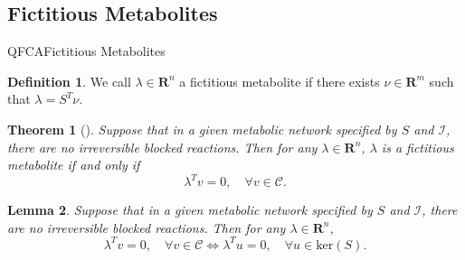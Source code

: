 \documentclass[10pt]{beamer}
\newtheorem{thm}{Theorem}[section]
\newtheorem{lem}[thm]{Lemma}
\theoremstyle{remark}
\theoremstyle{definition}
\newtheorem{dfn}{Definition}
\begin{document}
\subsection{Fictitious Metabolites}
\begin{frame}{QFCA}{Fictitious Metabolites}

	\begin{dfn}
	We call $\lambda\in\mathbf{R}^n$ a fictitious metabolite if there exists 
	$\nu \in \mathbf{R}^m$ such that $\lambda = S^T \nu$.
	\end{dfn}\pause
	
	\begin{thm}[]\label{range-thm}
	Suppose that in a given metabolic network specified by $S$ and $\mathcal{I}$, 
	there are no irreversible blocked reactions. Then for any $\lambda\in\mathbf{R}^n$, 
	$\lambda$ is a fictitious metabolite if and only if
	\[
	\lambda^Tv=0,\quad\forall v\in\mathcal{C}.
	\]
	\end{thm}\pause
	
	\begin{lem}\label{lemma}
	Suppose that in a given metabolic network specified by $S$ and $\mathcal{I}$, 
	there are no irreversible blocked reactions. Then for any $\lambda\in\mathbf{R}^n$, 
	\[
	\lambda^Tv=0,\quad\forall v\in\mathcal{C}\Leftrightarrow\lambda^Tu=0,\quad\forall u\in\mathrm{ker}(S).
	\]
	\end{lem}
\end{frame}
\end{document}
